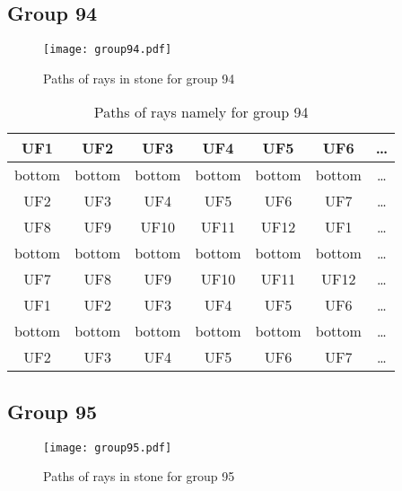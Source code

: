 \subsection*{Group 94}






\begin{figure}[h!]
\centering
\texttt{[image: group94.pdf]}
\caption{Paths of rays in stone for group 94}
\label{table:FigGroup94}
\end{figure}



\begin{table}[h!]
\centering
\begin{tabular}{|c|c|c|c|c|c|c|}
\hline
UF1 & UF2 & UF3 & UF4 & UF5 & UF6 & \dots \\
\hline
bottom & bottom & bottom & bottom & bottom & bottom & \dots \\
\hline
UF2 & UF3 & UF4 & UF5 & UF6 & UF7 & \dots \\
\hline
UF8 & UF9 & UF10 & UF11 & UF12 & UF1 & \dots \\
\hline
bottom & bottom & bottom & bottom & bottom & bottom & \dots \\
\hline
UF7 & UF8 & UF9 & UF10 & UF11 & UF12 & \dots \\
\hline
UF1 & UF2 & UF3 & UF4 & UF5 & UF6 & \dots \\
\hline
bottom & bottom & bottom & bottom & bottom & bottom & \dots \\
\hline
UF2 & UF3 & UF4 & UF5 & UF6 & UF7 & \dots \\
\hline
\end{tabular}
\caption{Paths of rays namely for group 94}
\label{table:TableGroup94}
\end{table}
\newpage
\subsection*{Group 95}






\begin{figure}[h!]
\centering
\texttt{[image: group95.pdf]}
\caption{Paths of rays in stone for group 95}
\label{table:FigGroup95}
\end{figure}



